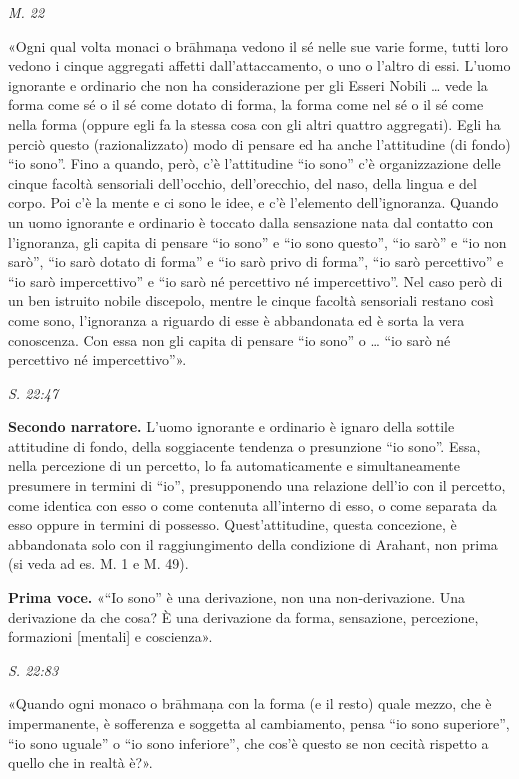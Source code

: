 \emph{M. 22}


«Ogni qual volta monaci o brāhmaṇa vedono il sé nelle sue varie forme,
tutti loro vedono i cinque aggregati affetti dall’attaccamento, o uno o
l’altro di essi. L’uomo ignorante e ordinario che non ha considerazione
per gli Esseri Nobili … vede la forma come sé o il sé come dotato di
forma, la forma come nel sé o il sé come nella forma (oppure egli fa la
stessa cosa con gli altri quattro aggregati). Egli ha perciò questo
(razionalizzato) modo di pensare ed ha anche l’attitudine (di fondo) “io
sono”. Fino a quando, però, c’è l’attitudine “io sono” c’è
organizzazione delle cinque facoltà sensoriali dell’occhio,
dell’orecchio, del naso, della lingua e del corpo. Poi c’è la mente e ci
sono le idee, e c’è l’elemento dell’ignoranza. Quando un uomo ignorante
e ordinario è toccato dalla sensazione nata dal contatto con
l’ignoranza, gli capita di pensare “io sono” e “io sono questo”, “io
sarò” e “io non sarò”, “io sarò dotato di forma” e “io sarò privo di
forma”, “io sarò percettivo” e “io sarò impercettivo” e “io sarò né
percettivo né impercettivo”. Nel caso però di un ben istruito nobile
discepolo, mentre le cinque facoltà sensoriali restano così come sono,
l’ignoranza a riguardo di esse è abbandonata ed è sorta la vera
conoscenza. Con essa non gli capita di pensare “io sono” o … “io sarò né
percettivo né impercettivo”».


\emph{S. 22:47}


\textbf{Secondo narratore.} L’uomo ignorante e ordinario è ignaro della sottile
attitudine di fondo, della soggiacente tendenza o presunzione “io sono”.
Essa, nella percezione di un percetto, lo fa automaticamente e
simultaneamente presumere in termini di “io”, presupponendo una
relazione dell’io con il percetto, come identica con esso o come
contenuta all’interno di esso, o come separata da esso oppure in termini
di possesso. Quest’attitudine, questa concezione, è abbandonata solo con
il raggiungimento della condizione di Arahant, non prima (si veda ad es.
M. 1 e M. 49).


\textbf{Prima voce.} «“Io sono” è una derivazione, non una non-derivazione. Una
derivazione da che cosa? È una derivazione da forma, sensazione,
percezione, formazioni [mentali] e coscienza».


\emph{S. 22:83}


«Quando ogni monaco o brāhmaṇa con la forma (e il resto) quale mezzo,
che è impermanente, è sofferenza e soggetta al cambiamento, pensa “io
sono superiore”, “io sono uguale” o “io sono inferiore”, che cos’è
questo se non cecità rispetto a quello che in realtà è?».


